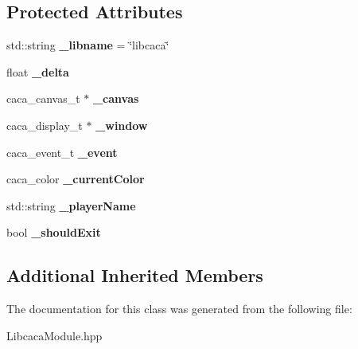 \subsection*{Protected Attributes}
\begin{DoxyCompactItemize}
\item 
\mbox{\label{class_libcaca_module_aaae865b66ea16059ccfef1a22c7cf085}} 
std\+::string {\bfseries \+\_\+libname} = \char`\"{}libcaca\char`\"{}
\item 
\mbox{\label{class_libcaca_module_a5dc1dab4650bed53be735cd57a8340e1}} 
float {\bfseries \+\_\+delta}
\item 
\mbox{\label{class_libcaca_module_a900c503cc78720c0d7058e517143ed1d}} 
caca\+\_\+canvas\+\_\+t $\ast$ {\bfseries \+\_\+canvas}
\item 
\mbox{\label{class_libcaca_module_a77fb99e86f6fdd613e4b9c371df0f2f6}} 
caca\+\_\+display\+\_\+t $\ast$ {\bfseries \+\_\+window}
\item 
\mbox{\label{class_libcaca_module_ad2122aa0e08cc2a92944221dc99e22b3}} 
caca\+\_\+event\+\_\+t {\bfseries \+\_\+event}
\item 
\mbox{\label{class_libcaca_module_ab880c469e01a7f23f7d1b4c0bebddc2a}} 
caca\+\_\+color {\bfseries \+\_\+current\+Color}
\item 
\mbox{\label{class_libcaca_module_ae114df33863c22a8c1ab6a46361bfd19}} 
std\+::string {\bfseries \+\_\+player\+Name}
\item 
\mbox{\label{class_libcaca_module_adba89f366c60fd814eabf669486e2fc5}} 
bool {\bfseries \+\_\+should\+Exit}
\end{DoxyCompactItemize}
\subsection*{Additional Inherited Members}


The documentation for this class was generated from the following file\+:\begin{DoxyCompactItemize}
\item 
Libcaca\+Module.\+hpp\end{DoxyCompactItemize}
